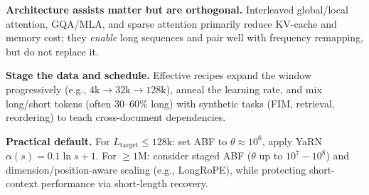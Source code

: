 \noindent\textbf{Architecture assists matter but are orthogonal.} Interleaved global/local attention, GQA/MLA, and sparse attention primarily reduce KV-cache and memory cost; they \emph{enable} long sequences and pair well with frequency remapping, but do not replace it.

\noindent\textbf{Stage the data and schedule.} Effective recipes expand the window progressively (e.g., \(4\text{k}\!\rightarrow\!32\text{k}\!\rightarrow\!128\text{k}\)), anneal the learning rate, and mix long/short tokens (often 30–60\% long) with synthetic tasks (FIM, retrieval, reordering) to teach cross-document dependencies.


\noindent\textbf{Practical default.} For \(L_{\text{target}}\!\le\!128\text{k}\): set ABF to \(\theta\!\approx\!10^6\), 
apply YaRN \(\alpha(s)=0.1\ln s+1\). For \(\ge\!1\text{M}\): consider staged ABF (\(\theta\) up to \(10^7\!-\!10^8\)) and dimension/position-aware scaling (e.g., LongRoPE), while protecting short-context performance via short-length recovery.
